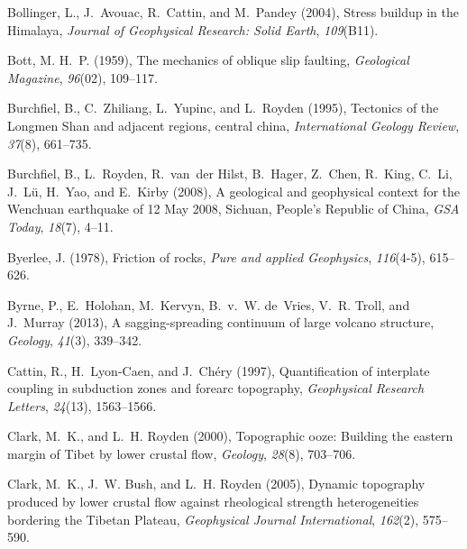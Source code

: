 \documentclass[twocolumn,jgrga]{AGUTeX}
\begin{document}
\begin{article}
{{\begin{thebibliography}{85}
Bollinger, L., J.~Avouac, R.~Cattin, and M.~Pandey (2004), Stress buildup in
  the {H}imalaya, \textit{Journal of Geophysical Research: Solid Earth},
  \textit{109}(B11).

Bott, M. H.~P. (1959), The mechanics of oblique slip faulting,
  \textit{Geological Magazine}, \textit{96}(02), 109--117.

Burchfiel, B., C.~Zhiliang, L.~Yupinc, and L.~Royden (1995), Tectonics of the
  {L}ongmen {S}han and adjacent regions, central {}china, \textit{International
  Geology Review}, \textit{37}(8), 661--735.

Burchfiel, B., L.~Royden, R.~van~der Hilst, B.~Hager, Z.~Chen, R.~King, C.~Li,
  J.~L{\"u}, H.~Yao, and E.~Kirby (2008), A geological and geophysical context
  for the {W}enchuan earthquake of 12 {M}ay 2008, {S}ichuan, {P}eople's
  {R}epublic of {C}hina, \textit{GSA Today}, \textit{18}(7), 4--11.

Byerlee, J. (1978), Friction of rocks, \textit{Pure and applied Geophysics},
  \textit{116}(4-5), 615--626.

Byrne, P., E.~Holohan, M.~Kervyn, B.~v.~W. de~Vries, V.~R. Troll, and J.~Murray
  (2013), A sagging-spreading continuum of large volcano structure,
  \textit{Geology}, \textit{41}(3), 339--342.

Cattin, R., H.~Lyon-Caen, and J.~Ch{\'e}ry (1997), Quantification of interplate
  coupling in subduction zones and forearc topography, \textit{Geophysical
  Research Letters}, \textit{24}(13), 1563--1566.

Clark, M.~K., and L.~H. Royden (2000), Topographic ooze: {B}uilding the eastern
  margin of {T}ibet by lower crustal flow, \textit{Geology}, \textit{28}(8),
  703--706.

Clark, M.~K., J.~W. Bush, and L.~H. Royden (2005), Dynamic topography produced
  by lower crustal flow against rheological strength heterogeneities bordering
  the {T}ibetan {P}lateau, \textit{Geophysical Journal International},
  \textit{162}(2), 575--590.


\end{thebibliography}}}
\end{article}
\end{document}
